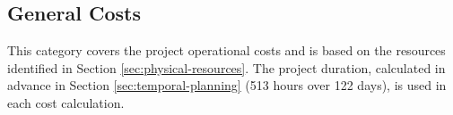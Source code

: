 \subsection{General Costs}
This category covers the project operational costs and is based on the resources identified in Section \ref{sec:physical-resources}. The project duration, calculated in advance in Section \ref{sec:temporal-planning} (513 hours over 122 days), is used in each cost calculation. 








